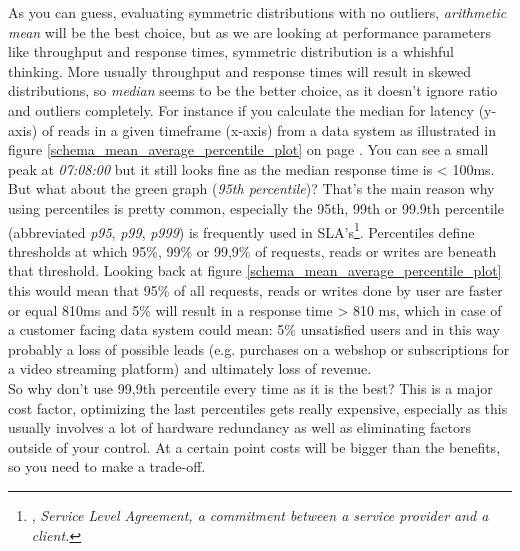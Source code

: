 As you can guess, evaluating symmetric distributions with no outliers, \textit{arithmetic mean} will be the best choice, but as we are looking at performance parameters like throughput and response times, symmetric distribution is a whishful thinking. More usually throughput and response times will result in skewed distributions, so \textit{median} seems to be the better choice, as it doesn't ignore ratio and outliers completely. For instance if you calculate the median for latency (y-axis) of reads in a given timeframe (x-axis) from a data system as illustrated in figure \ref{schema_mean_average_percentile_plot} on page \pageref{schema_mean_average_percentile_plot}. You can see a small peak at \textit{07:08:00} but it still looks fine as the median response time is < 100ms. But what about the green graph (\textit{95th percentile})? That's the main reason why using percentiles is pretty common, especially the 95th, 99th or 99.9th percentile (abbreviated \textit{p95}, \textit{p99}, \textit{p999}) is frequently used in SLA's\footnote{\cite{WKSLA}, \textit{Service Level Agreement, a commitment between a service provider and a client.}}. Percentiles define thresholds at which 95\%, 99\% or 99,9\% of requests, reads or writes are beneath that threshold. Looking back at figure \ref{schema_mean_average_percentile_plot} this would mean that 95\% of all requests, reads or writes done by user are faster or equal 810ms and 5\% will result in a response time > 810 ms, which in case of a customer facing data system could mean: 5\% unsatisfied users and in this way probably a loss of possible leads (e.g. purchases on a webshop or subscriptions for a video streaming platform) and ultimately loss of revenue.\\
So why don't use 99,9th percentile every time as it is the best? This is a major cost factor, optimizing the last percentiles gets really expensive, especially as this usually involves a lot of hardware redundancy as well as eliminating factors outside of your control. At a certain point costs will be bigger than the benefits, so you need to make a trade-off. \\[0.5 cm]
\hspace*{4mm}%
